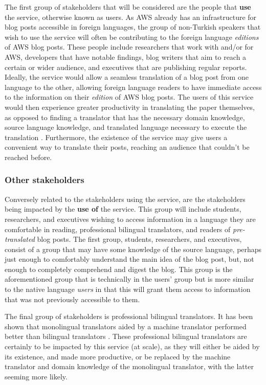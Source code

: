\indent \indent The first group of stakeholders that will be considered are the people that \textbf{use} the service, otherwise known as users. As AWS already has an infrastructure for blog posts accessible in foreign languages, the group of non-Turkish speakers that wish to use the service will often be contributing to the foreign language \textit{editions} of AWS blog posts. These people include researchers that work with and/or for AWS, developers that have notable findings, blog writers that aim to reach a certain or wider audience, and executives that are publishing regular reports. Ideally, the service would allow a seamless translation of a blog post from one language to the other, allowing foreign language readers to have immediate access to the information on their \textit{edition} of AWS blog posts. The users of this service would then experience greater productivity in translating the paper themselves, as opposed to finding a translator that has the necessary domain knowledge, source language knowledge, and translated language necessary to execute the translation \cite{Koen2010}. Furthermore, the existence of the service may give users a convenient way to translate their posts, reaching an audience that couldn't be reached before.

\subsubsection*{Other stakeholders}

\indent \indent Conversely related to the stakeholders using the service, are the stakeholders being impacted by the \textbf{use of} the service. This group will include students, researchers, and executives wishing to access information in a language they are comfortable in reading, professional bilingual translators, and readers of \textit{pre-translated} blog posts. The first group, students, researchers, and executives, consist of a group that may have some knowledge of the source language, perhaps just enough to comfortably understand the main idea of the blog post, but, not enough to completely comprehend and digest the blog. This group is the aforementioned group that is technically in the users' group but is more similar to the native language \textit{users} in that this will grant them access to information that was not previously accessible to them. 

\indent The final group of stakeholders is professional bilingual translators. It has been shown that monolingual translators aided by a machine translator performed better than bilingual translators \cite{Koen2010}. These professional bilingual translators are certainly to be impacted by this service (at scale), as they will either be aided by its existence, and made more productive, or be replaced by the machine translator and domain knowledge of the monolingual translator, with the latter seeming more likely.

